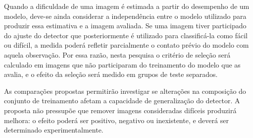 Quando a dificuldade de uma imagem \'e estimada a partir do desempenho de um modelo, deve-se ainda considerar a independ\^encia entre o modelo utilizado para produzir essa estimativa e a imagem avaliada. Se uma imagem tiver participado do ajuste do detector que posteriormente \'e utilizado para classific\'a-la como f\'acil ou dif\'icil, a medida poder\'a refletir parcialmente o contato pr\'evio do modelo com aquela observa\c{c}\~ao. Por essa raz\~ao, nesta pesquisa o crit\'erio de sele\c{c}\~ao ser\'a calculado em imagens que n\~ao participaram do treinamento do modelo que as avalia, e o efeito da sele\c{c}\~ao ser\'a medido em grupos de teste separados.

As compara\c{c}\~oes propostas permitir\~ao investigar se altera\c{c}\~oes na composi\c{c}\~ao do conjunto de treinamento afetam a capacidade de generaliza\c{c}\~ao do detector. A proposta n\~ao pressup\~oe que remover imagens consideradas dif\'iceis produzir\'a melhora: o efeito poder\'a ser positivo, negativo ou inexistente, e dever\'a ser determinado experimentalmente.
